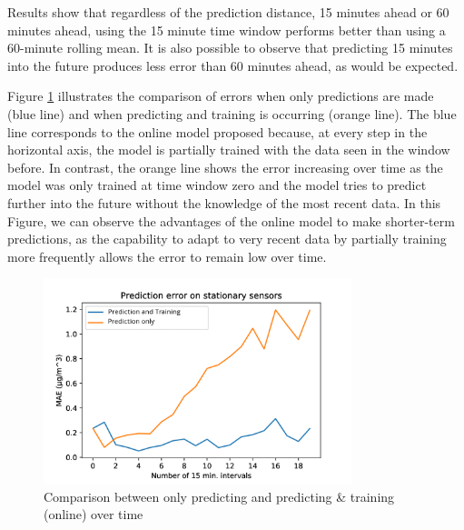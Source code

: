 \begin{table}[h]
\centering
{}
\caption{MAE and MSE comparison of time windows and prediction distance}
\label{tab:distance_pred}
\end{table}

Results show that regardless of the prediction distance, 15 minutes ahead or 60 minutes ahead, using the 15 minute time window performs better than using a 60-minute rolling mean. It is also possible to observe that predicting 15 minutes into the future produces less error than 60 minutes ahead, as would be expected.

Figure \ref{fig:errorahead} illustrates the comparison of errors when only predictions are made (blue line) and when predicting and training is occurring (orange line). The blue line corresponds to the online model proposed because, at every step in the horizontal axis, the model is partially trained with the data seen in the window before. In contrast, the orange line shows the error increasing over time as the model was only trained at time window zero and the model tries to predict further into the future without the knowledge of the most recent data. In this Figure, we can observe the advantages of the online model to make shorter-term predictions, as the capability to adapt to very recent data by partially training more frequently allows the error to remain low over time.

\begin{figure}[h]
    \centering
    \includegraphics[width=0.8\textwidth]{images/prediction_error.png}
    \caption{Comparison between only predicting and predicting \& training (online) over time}
    \label{fig:errorahead}
\end{figure}

